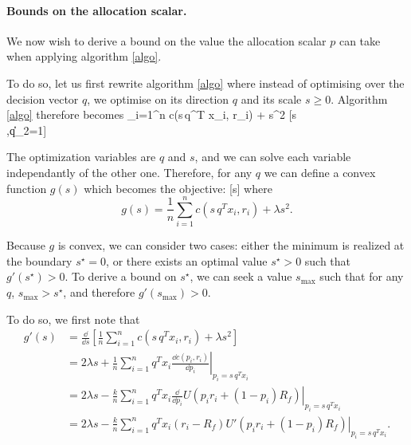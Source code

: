 
\paragraph{Bounds on the allocation scalar.}
We now wish to derive a bound on the value the allocation scalar $p$ can take when
applying algorithm \eqref{algo}.

To do so, let us first rewrite algorithm \eqref{algo} where instead of optimising over the
decision vector $q$, we optimise on its direction $q$ and its scale $s\geq0$. Algorithm
\eqref{algo} therefore becomes \minimizeEquation%
{\sum_{i=1}^n c(s\,q^T x_i, r_i) + \lambda s^2}%
[s\\,\|q\|_2=1]

The optimization variables are $q$ and $s$, and we can solve each variable independantly
of the other one. Therefore, for any $q$ we can define a convex function $g(s)$ which
becomes the objective: [s] where
\begin{equation*}
  g(s) = \frac{1}{n} \sum_{i=1}^n c(s\,q^T x_i, r_i) + \lambda s^2.
\end{equation*}

Because $g$ is convex, we can consider two cases: either the minimum is realized at the
boundary $s^\star=0$, or there exists an optimal value $s^\star > 0$ such that
$g'(s^\star) > 0$. To derive a bound on $s^\star$, we can seek a value $s_{\max}$ such
that for any $q$, $s_{\max} > s^\star$, and therefore $g'(s_{\max}) > 0$.

To do so, we first note that
\begin{align*}
    g'(s) &= \frac{\dd}{\dd s}\left[\frac{1}{n} \sum_{i=1}^n c(s\, q^{T}x_i, r_i) + \lambda s^2\right]\\
          &= 2\lambda s + \frac{1}{n} \sum_{i=1}^n q^{T}x_i \left. \frac{\dd c(p_i,r_i)}{\dd p_i} \right|_{p_i =
            s\,q^{T}x_i} \\
          &= 2\lambda s - \frac{k}{n} \sum_{i=1}^n q^{T}x_i \left. \frac{\dd}{\dd p_i} U(p_i r_i +
            (1-p_i)R_f) \right|_{p_i = s\,q^{T}x_i}\\
          &= 2\lambda s - \frac{k}{n} \sum_{i=1}^n q^{T}x_i (r_i-R_f) \left. U'(p_i r_i +
            (1-p_i)R_f) \right|_{p_i = s\,q^{T}x_i}.
\end{align*}

